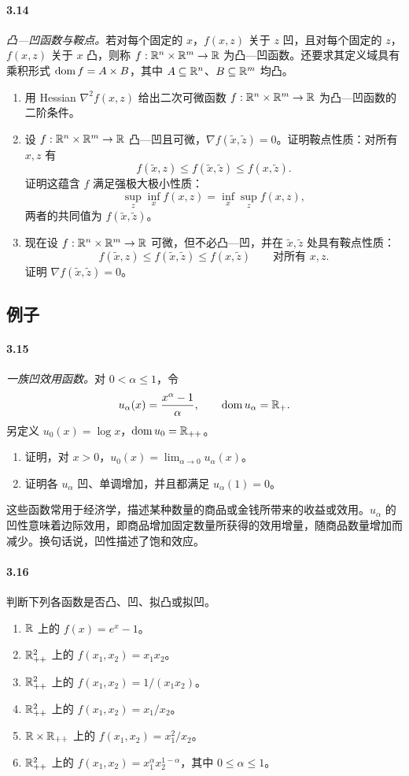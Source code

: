 \paragraph{3.14}\textit{凸—凹函数与鞍点。}若对每个固定的 $x$，$f(x,z)$ 关于 $z$ 凹，且对每个固定的 $z$，$f(x,z)$ 关于 $x$ 凸，则称 $f:\mathbb R^n\times\mathbb R^m\to\mathbb R$ 为凸—凹函数。还要求其定义域具有乘积形式 $\operatorname{dom} f=A\times B$，其中 $A\subseteq\mathbb R^n$、$B\subseteq\mathbb R^m$ 均凸。
\begin{enumerate}[label=(\alph*)]
\item 用 Hessian $\nabla^2f(x,z)$ 给出二次可微函数 $f:\mathbb R^n\times\mathbb R^m\to\mathbb R$ 为凸—凹函数的二阶条件。
\item 设 $f:\mathbb R^n\times\mathbb R^m\to\mathbb R$ 凸—凹且可微，$\nabla f(\widetilde x,\widetilde z)=0$。证明鞍点性质：对所有 $x,z$ 有
\[f(\widetilde x,z)\leq f(\widetilde x,\widetilde z)\leq f(x,\widetilde z).\]
证明这蕴含 $f$ 满足强极大极小性质：
\[\sup_z\inf_x f(x,z)=\inf_x\sup_z f(x,z),\]
两者的共同值为 $f(\widetilde x,\widetilde z)$。
\item 现在设 $f:\mathbb R^n\times\mathbb R^m\to\mathbb R$ 可微，但不必凸—凹，并在 $\widetilde x,\widetilde z$ 处具有鞍点性质：
\[f(\widetilde x,z)\leq f(\widetilde x,\widetilde z)\leq f(x,\widetilde z)\qquad\text{对所有 }x,z.\]
证明 $\nabla f(\widetilde x,\widetilde z)=0$。
\end{enumerate}
\subsection*{例子}
\paragraph{3.15}\textit{一族凹效用函数。}对 $0<\alpha\leq1$，令
\[u_\alpha(x)=\frac{x^\alpha-1}{\alpha},\qquad\operatorname{dom} u_\alpha=\mathbb R_+.\]
另定义 $u_0(x)=\log x$，$\operatorname{dom} u_0=\mathbb R_{++}$。
\begin{enumerate}[label=(\alph*)]
\item 证明，对 $x>0$，$u_0(x)=\lim_{\alpha\to0}u_\alpha(x)$。
\item 证明各 $u_\alpha$ 凹、单调增加，并且都满足 $u_\alpha(1)=0$。
\end{enumerate}
这些函数常用于经济学，描述某种数量的商品或金钱所带来的收益或效用。$u_\alpha$ 的凹性意味着边际效用，即商品增加固定数量所获得的效用增量，随商品数量增加而减少。换句话说，凹性描述了饱和效应。
\paragraph{3.16}判断下列各函数是否凸、凹、拟凸或拟凹。
\begin{enumerate}[label=(\alph*)]
\item $\mathbb R$ 上的 $f(x)=e^x-1$。
\item $\mathbb R_{++}^2$ 上的 $f(x_1,x_2)=x_1x_2$。
\item $\mathbb R_{++}^2$ 上的 $f(x_1,x_2)=1/(x_1x_2)$。
\item $\mathbb R_{++}^2$ 上的 $f(x_1,x_2)=x_1/x_2$。
\item $\mathbb R\times\mathbb R_{++}$ 上的 $f(x_1,x_2)=x_1^2/x_2$。
\item $\mathbb R_{++}^2$ 上的 $f(x_1,x_2)=x_1^\alpha x_2^{1-\alpha}$，其中 $0\leq\alpha\leq1$。
\end{enumerate}
